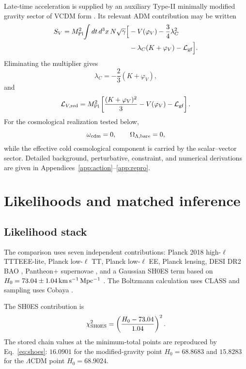 \documentclass[aps,prd,twocolumn,superscriptaddress,nofootinbib,longbibliography,floatfix]{revtex4-2}
\newcommand{\LCDM}{\Lambda\mathrm{CDM}}
\newcommand{\mpl}{M_{\rm Pl}}
\begin{document}
Late-time acceleration is supplied by an auxiliary Type-II minimally modified gravity sector of VCDM form \cite{DeFeliceMukohyamaPookkillath2021,DeFeliceMaedaMukohyamaPookkillath2022,GanzMartensMukohyamaNamba2023,AkarsuEtAl2024VCDM,AkarsuEtAl2026VCDM}. Its relevant ADM contribution may be written
\begin{align}
S_V=\mpl^2\!\int dt\,d^3x\,N\sqrt{\gamma}\Big[&-V(\varphi_V)-\frac34\lambda_C^2\nonumber\\
&-\lambda_C(K+\varphi_V)-\mathcal L_{\rm gf}\Big].
\label{eq:vcdm-aux}
\end{align}
Eliminating the multiplier gives
\begin{equation}
\lambda_C=-\frac23(K+\varphi_V),
\end{equation}
and
\begin{equation}
\mathcal L_{V,\rm red}=\mpl^2\left[\frac{(K+\varphi_V)^2}{3}-V(\varphi_V)-\mathcal L_{\rm gf}\right].
\label{eq:vcdm-red}
\end{equation}
For the cosmological realization tested below,
\begin{equation}
\omega_{\rm cdm}=0,\qquad \Omega_{\Lambda,\rm bare}=0,
\end{equation}
while the effective cold cosmological component is carried by the scalar--vector sector. Detailed background, perturbative, constraint, and numerical derivations are given in Appendices~\ref{app:action}--\ref{app:repro}.

\section{Likelihoods and matched inference}\label{sec:methods}
\subsection{Likelihood stack}
The comparison uses seven independent contributions: Planck 2018 high-$\ell$ TTTEEE-lite, Planck low-$\ell$ TT, Planck low-$\ell$ EE, Planck lensing, DESI DR2 BAO \cite{DESIDR2II2025}, Pantheon+ supernovae \cite{Brout2022,Scolnic2022}, and a Gaussian SH0ES term based on $H_0=73.04\pm1.04\,{\rm km\,s^{-1}\,Mpc^{-1}}$ \cite{Riess2022}. The Boltzmann calculation uses CLASS \cite{Lesgourgues2011CLASS,Blas2011CLASS} and sampling uses Cobaya \cite{TorradoLewis2021}.

The SH0ES contribution is
\begin{equation}
\chi^2_{\rm SH0ES}=\left(\frac{H_0-73.04}{1.04}\right)^2.
\label{eq:shoes}
\end{equation}
The stored chain values at the minimum-total points are reproduced by Eq.~\eqref{eq:shoes}: $16.0901$ for the modified-gravity point $H_0=68.8683$ and $15.8283$ for the $\LCDM$ point $H_0=68.9024$.
\end{document}
